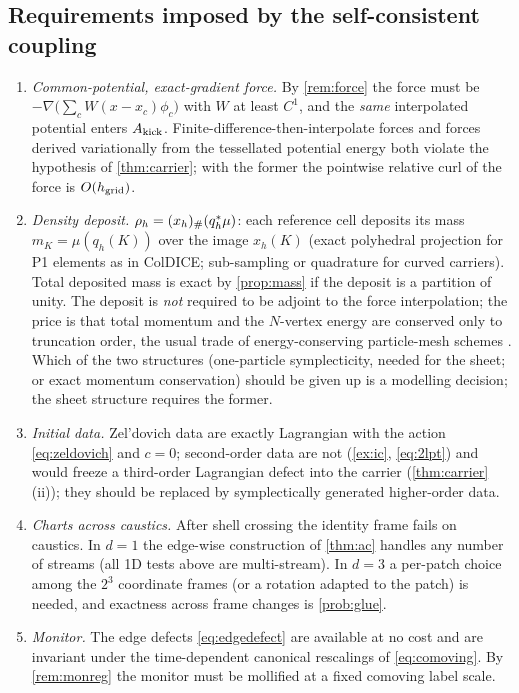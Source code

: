 \subsection{Requirements imposed by the self-consistent coupling}

\begin{enumerate}[leftmargin=2em,itemsep=3pt]
\item \emph{Common-potential, exact-gradient force.} By \cref{rem:force} the force must be
$-\nabla\big(\sum_cW(x-x_c)\phi_c\big)$ with $W$ at least $C^1$, and the \emph{same} interpolated potential enters
$A_{\rm kick}$. Finite-difference-then-interpolate forces and forces derived variationally from the tessellated
potential energy both violate the hypothesis of \cref{thm:carrier}; with the former the pointwise relative curl of
the force is $O(h_{\rm grid})$.
\item \emph{Density deposit.} $\rho_h=(x_h){}_{\#}(q_h^*\mu)$: each reference cell deposits its mass
$m_K=\mu(q_h(K))$ over the image $x_h(K)$ (exact polyhedral projection for P1 elements as in ColDICE; sub-sampling or
quadrature for curved carriers). Total deposited mass is exact by \cref{prop:mass} if the deposit is a partition of
unity. The deposit is \emph{not} required to be adjoint to the force interpolation; the price is that total
momentum and the $N$-vertex energy are conserved only to truncation order, the usual trade of energy-conserving
particle-mesh schemes \cite{HockneyEastwood}. Which of the two structures (one-particle symplecticity, needed for the
sheet; or exact momentum conservation) should be given up is a modelling decision; the sheet structure requires the former.
\item \emph{Initial data.} Zel'dovich data are exactly Lagrangian with the action \eqref{eq:zeldovich} and $c=0$;
second-order data are not (\cref{ex:ic}, \eqref{eq:2lpt}) and would freeze a third-order Lagrangian defect into the
carrier (\cref{thm:carrier}(ii)); they should be replaced by symplectically generated higher-order data.
\item \emph{Charts across caustics.} After shell crossing the identity frame fails on caustics. In $d=1$ the
edge-wise construction of \cref{thm:ac} handles any number of streams (all 1D tests above are multi-stream). In
$d=3$ a per-patch choice among the $2^3$ coordinate frames (or a rotation adapted to the patch) is needed, and
exactness across frame changes is \cref{prob:glue}.
\item \emph{Monitor.} The edge defects \eqref{eq:edgedefect} are available at no cost and are invariant under the
time-dependent canonical rescalings of \eqref{eq:comoving}. By \cref{rem:monreg} the monitor must be mollified at a
fixed comoving label scale.
\end{enumerate}


